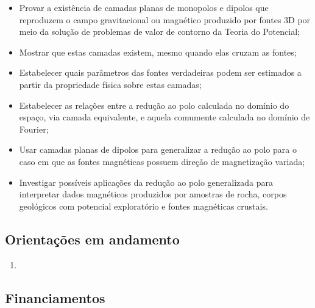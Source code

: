 \begin{itemize}
	\item[\parbox{0.03\textwidth}{\vspace{-0.1\baselineskip}\faSquareRoot*}]
	Provar a existência de camadas planas de monopolos e dipolos que reproduzem
	o campo gravitacional ou magnético produzido por fontes 3D por meio da solução
	de problemas de valor de contorno da Teoria do Potencial;
	\item[\parbox{0.03\textwidth}{\vspace{-0.1\baselineskip}\faSquareRoot*}]
	Mostrar que estas camadas existem, mesmo quando elas cruzam as fontes;
	\item[\parbox{0.03\textwidth}{\vspace{-0.1\baselineskip}\faSquareRoot*}]
	Estabelecer quais parâmetros das fontes verdadeiras podem ser estimados a
	partir da propriedade física sobre estas camadas;
	\item[\parbox{0.03\textwidth}{\vspace{-0.1\baselineskip}\faSquareRoot*}]
	Estabelecer as relações entre a redução ao polo calculada no domínio do espaço,
	via camada equivalente, e aquela comumente calculada no domínio de Fourier;
	\item[\parbox{0.03\textwidth}{\vspace{-0.1\baselineskip}\faSquareRoot*}]
	Usar camadas planas de dipolos para generalizar a redução ao polo para o caso 
	em que as fontes magnéticas possuem direção de magnetização variada;
	\item[\parbox{0.03\textwidth}{\vspace{-0.1\baselineskip}\faSquareRoot*}]
	Investigar possíveis aplicações da redução ao polo generalizada para 
	interpretar dados magnéticos produzidos por amostras de rocha, corpos geológicos com 
	potencial exploratório e fontes magnéticas crustais.
\end{itemize}

\subsection*{Orientações em andamento}

\begin{enumerate}
	\item{}	
\end{enumerate}

\subsection*{Financiamentos}

